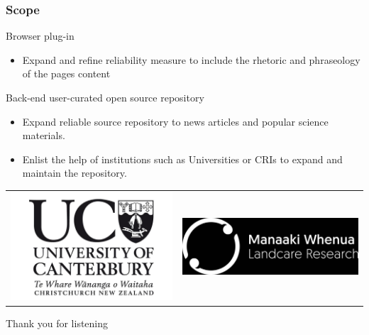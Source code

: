 \documentclass{beamer}
\begin{document}


\begin{frame} \frametitle{Scope}
	Browser plug-in
	\begin{itemize}
	\item Expand and refine reliability measure to include the rhetoric and phraseology of the pages content
	\end{itemize}
	Back-end user-curated open source repository
	\begin{itemize}
	    \item Expand reliable source repository to news articles and popular science materials. 
	    \item Enlist the help of institutions such as Universities or CRIs to expand and maintain the repository.
	\end{itemize}
	\centering
	\begin{tabular}{ c c }
		\includegraphics[scale=0.1]{Figures/UC-Logo-3-2_3654775638524282877.jpg} & \includegraphics[scale=0.3]{Figures/mwlr-white-on-black.jpg}
	\end{tabular}
\end{frame}


\begin{frame}
	 \huge
	 \begin{center}
	 	Thank you for listening
	 \end{center} 
\end{frame}
\end{document}
